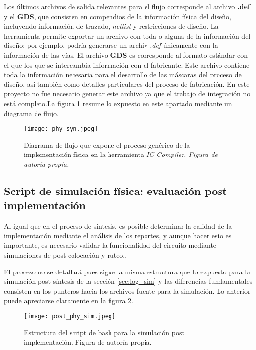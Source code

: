 Los últimos archivos de salida relevantes para el flujo corresponde al archivo \textbf{.def} y el \textbf{GDS}, que consisten en compendios de la información física del diseño, incluyendo información de trazado, \textit{netlist} y restricciones de diseño. La herramienta permite exportar un archivo con toda o alguna de la información del diseño; por ejemplo, podría generarse un archiv \textit{.def} únicamente con la información de las vías. El archivo \textbf{GDS} es corresponde al formato estándar con el que los que se intercambia información con el fabricante. Este archivo contiene toda la información necesaria para el desarrollo de las máscaras del proceso de diseño, así también como detalles particulares del proceso de fabricación. En este proyecto no fue necesario generar este archivo ya que el trabajo de integración no está completo.La figura \ref{fig:phy_script} resume lo expuesto en este apartado mediante un diagrama de flujo.

\begin{figure}[ht]
\texttt{[image: phy\_syn.jpeg]}
\centering
\caption{Diagrama de flujo que expone el proceso genérico de la implementación física en la herramienta \textit{IC Compiler. Figura de autoría propia.}}
\label{fig:phy_script}
\end{figure}

\subsection{Script de simulación física: evaluación post implementación}

Al igual que en el proceso de síntesis, es posible determinar la calidad de la implementación mediante el análisis de los reportes, y aunque hacer esto es importante, es necesario validar la funcionalidad del circuito mediante simulaciones de post colocación y ruteo..

El proceso no se detallará pues sigue la misma estructura que lo expuesto para la simulación post síntesis de la sección \ref{sec:log_sim} y las diferencias fundamentales consisten en los punteros hacia los archivos fuente para la simulación. Lo anterior puede apreciarse claramente en la figura \ref{fig:phy_sim}.

\begin{figure}[ht]
\texttt{[image: post\_phy\_sim.jpeg]}
\centering
\caption{Estructura del script de bash para la simulación post implementación. Figura de autoría propia.}
\label{fig:phy_sim}
\end{figure}

